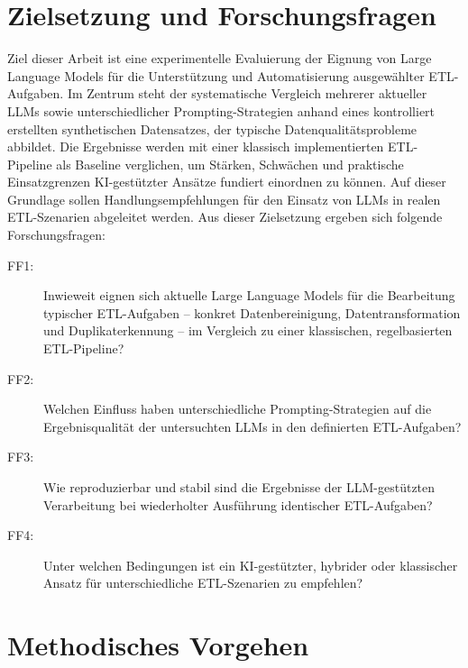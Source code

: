 \section{Zielsetzung und Forschungsfragen}
\label{subsec:zielsetzung}

Ziel dieser Arbeit ist eine experimentelle Evaluierung der Eignung von Large Language Models für die Unterstützung und Automatisierung ausgewählter ETL-Aufgaben. Im Zentrum steht der systematische Vergleich mehrerer aktueller LLMs sowie unterschiedlicher Prompting-Strategien anhand eines kontrolliert erstellten synthetischen Datensatzes, der typische Datenqualitätsprobleme abbildet. Die Ergebnisse werden mit einer klassisch implementierten ETL-Pipeline als Baseline verglichen, um Stärken, Schwächen und praktische Einsatzgrenzen KI-gestützter Ansätze fundiert einordnen zu können. Auf dieser Grundlage sollen Handlungsempfehlungen für den Einsatz von LLMs in realen ETL-Szenarien abgeleitet werden.
Aus dieser Zielsetzung ergeben sich folgende Forschungsfragen:

\begin{description}
    \item[FF1:] Inwieweit eignen sich aktuelle Large Language Models für die Bearbeitung typischer ETL-Aufgaben -- konkret Datenbereinigung, Datentransformation und Duplikaterkennung -- im Vergleich zu einer klassischen, regelbasierten ETL-Pipeline?
    \item[FF2:] Welchen Einfluss haben unterschiedliche Prompting-Strategien auf die Ergebnisqualität der untersuchten LLMs in den definierten ETL-Aufgaben?
    \item[FF3:] Wie reproduzierbar und stabil sind die Ergebnisse der LLM-gestützten Verarbeitung bei wiederholter Ausführung identischer ETL-Aufgaben?
    \item[FF4:] Unter welchen Bedingungen ist ein KI-gestützter, hybrider oder klassischer Ansatz für unterschiedliche ETL-Szenarien zu empfehlen?
\end{description}

\section{Methodisches Vorgehen}
\label{sec:methodik}

